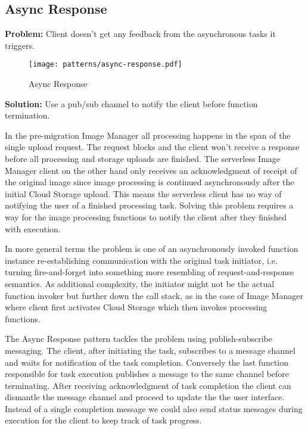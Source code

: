 \subsection{Async Response} \label{subsec:AsyncResponse}

\textbf{Problem:} Client doesn't get any feedback from the asynchronous tasks it triggers.

\begin{figure}[h]
  \centering
  \texttt{[image: patterns/async-response.pdf]}
  \caption{Async Response}
  \label{fig:asyncResponse}
\end{figure}

\textbf{Solution:} Use a pub/sub channel to notify the client before function termination.

In the pre-migration Image Manager all processing happens in the span of the single upload request. The request blocks and the client won't receive a response before all processing and storage uploads are finished. The serverless Image Manager client on the other hand only receives an acknowledgment of receipt of the original image since image processing is continued asynchronously after the initial Cloud Storage upload. This means the serverless client has no way of notifying the user of a finished processing task. Solving this problem requires a way for the image processing functions to notify the client after they finished with execution.

In more general terms the problem is one of an asynchronously invoked function instance re-establishing communication with the original task initiator, i.e. turning fire-and-forget into something more resembling of request-and-response semantics. As additional complexity, the initiator might not be the actual function invoker but further down the call stack, as in the case of Image Manager where client first activates Cloud Storage which then invokes processing functions.

The Async Response pattern tackles the problem using publish-subscribe messaging. The client, after initiating the task, subscribes to a message channel and waits for notification of the task completion. Conversely the last function responsible for task execution publishes a message to the same channel before terminating. After receiving acknowledgment of task completion the client can dismantle the message channel and proceed to update the the user interface. Instead of a single completion message we could also send status messages during execution for the client to keep track of task progress.

